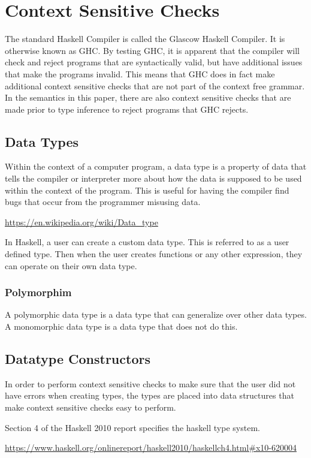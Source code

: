 \chapter{Context Sensitive Checks}
The standard Haskell Compiler is called the Glascow Haskell Compiler. It is otherwise known as GHC. By testing GHC, it is apparent that the compiler will check and reject programs that are syntactically valid, but have additional issues that make the programs invalid. This means that GHC does in fact make additional context sensitive checks that are not part of the context free grammar. In the semantics in this paper, there are also context sensitive checks that are made prior to type inference to reject programs that GHC rejects.

\section{Data Types}
Within the context of a computer program, a data type is a property of data that tells the compiler or interpreter more about how the data is supposed to be used within the context of the program. This is useful for having the compiler find bugs that occur from the programmer misusing data.

\url{https://en.wikipedia.org/wiki/Data_type}

In Haskell, a user can create a custom data type. This is referred to as a user defined type. Then when the user creates functions or any other expression, they can operate on their own data type.

\subsection{Polymorphim}
A polymorphic data type is a data type that can generalize over other data types.
A monomorphic data type is a data type that does not do this.

\section{Datatype Constructors}

In order to perform context sensitive checks to make sure that the user did not have errors when creating types, the types are placed into data structures that make context sensitive checks easy to perform.

Section 4 of the Haskell 2010 report specifies the haskell type system.

\url{https://www.haskell.org/onlinereport/haskell2010/haskellch4.html#x10-620004}

